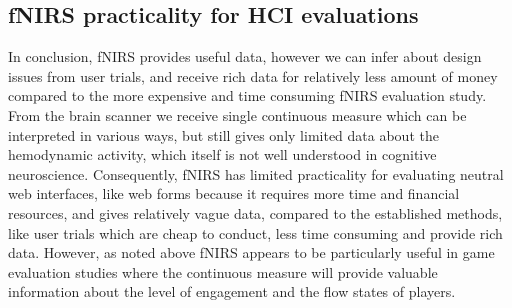 \documentclass[../main/Replicate.tex]{subfiles}
\begin{document}
	\subsection{fNIRS practicality for HCI evaluations}	
	In conclusion, fNIRS provides useful data, however we can infer about design issues from user trials, and receive rich data for relatively less amount of money compared to the more expensive and time consuming fNIRS evaluation study. From the brain scanner we receive single continuous measure which can be interpreted in various ways, but still gives only limited data about the hemodynamic activity, which itself is not well understood in cognitive neuroscience. Consequently, fNIRS has limited practicality for evaluating neutral web interfaces, like web forms because it requires more time and financial resources, and gives relatively vague data, compared to the established methods, like user trials which are cheap to conduct, less time consuming and provide rich data. However, as noted above fNIRS appears to be particularly useful in game evaluation studies where the continuous measure will provide valuable information about the level of engagement\cite{harrivel2013monitoring} and the flow states\cite{yoshida2014brain} of players.	
	
\end{document}
